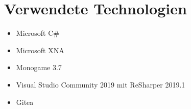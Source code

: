\section{Verwendete Technologien}


\begin{itemize}[leftmargin=*, nosep]
    \item Microsoft C\#
    \item Microsoft XNA
    \item Monogame 3.7
    \item Visual Studio Community 2019 mit ReSharper 2019.1
    \item Gitea
\end{itemize}
